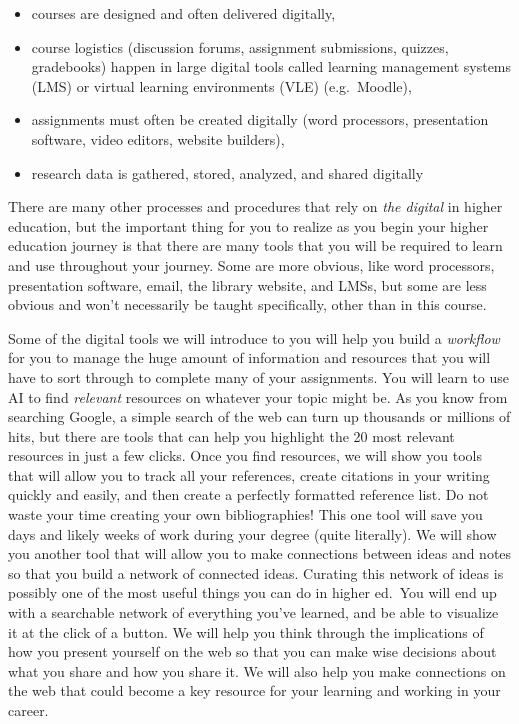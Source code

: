 \documentclass[
]{book}
\providecommand{\tightlist}{%
  \setlength{\itemsep}{0pt}\setlength{\parskip}{0pt}}
\theoremstyle{definition}
\theoremstyle{definition}
\theoremstyle{definition}
\theoremstyle{definition}
\theoremstyle{remark}
\begin{document}
\begin{itemize}
\tightlist
\item
  courses are designed and often delivered digitally,
\item
  course logistics (discussion forums, assignment submissions, quizzes, gradebooks) happen in large digital tools called learning management systems (LMS) or virtual learning environments (VLE) (e.g.~Moodle),
\item
  assignments must often be created digitally (word processors, presentation software, video editors, website builders),
\item
  research data is gathered, stored, analyzed, and shared digitally
\end{itemize}

There are many other processes and procedures that rely on \emph{the digital} in higher education, but the important thing for you to realize as you begin your higher education journey is that there are many tools that you will be required to learn and use throughout your journey. Some are more obvious, like word processors, presentation software, email, the library website, and LMSs, but some are less obvious and won't necessarily be taught specifically, other than in this course.

Some of the digital tools we will introduce to you will help you build a \emph{workflow} for you to manage the huge amount of information and resources that you will have to sort through to complete many of your assignments. You will learn to use AI to find \emph{relevant} resources on whatever your topic might be. As you know from searching Google, a simple search of the web can turn up thousands or millions of hits, but there are tools that can help you highlight the 20 most relevant resources in just a few clicks. Once you find resources, we will show you tools that will allow you to track all your references, create citations in your writing quickly and easily, and then create a perfectly formatted reference list. Do not waste your time creating your own bibliographies! This one tool will save you days and likely weeks of work during your degree (quite literally). We will show you another tool that will allow you to make connections between ideas and notes so that you build a network of connected ideas. Curating this network of ideas is possibly one of the most useful things you can do in higher ed.~You will end up with a searchable network of everything you've learned, and be able to visualize it at the click of a button. We will help you think through the implications of how you present yourself on the web so that you can make wise decisions about what you share and how you share it. We will also help you make connections on the web that could become a key resource for your learning and working in your career.
\end{document}

